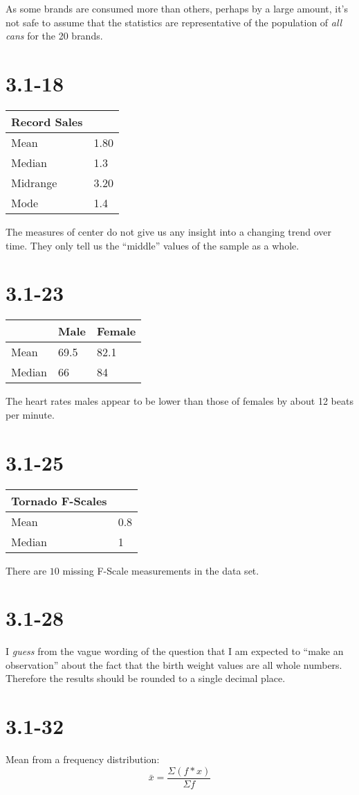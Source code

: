 \documentclass[12pt,fleqn]{article}
\newcommand{\chapter}{3.1}
\newcommand{\problem}[1]{\vspace{5ex}\section*{\chapter-#1}}
\newcommand{\thead}[1]{\textnormal{\textbf{#1}}}
\begin{document}
As some brands are consumed more than others, perhaps by a large amount, it's not safe to assume that the statistics are representative of the population of \textit{all cans} for the 20 brands.


\problem{18}
\begin{tabular}{@{}ll@{}}
  \thead{Record Sales} \\
  \toprule
  Mean & 1.80 \\
  Median & 1.3 \\
  Midrange & 3.20 \\
  Mode & 1.4 \\
  \bottomrule
\end{tabular}
\vspace{1em}

The measures of center do not give us any insight into a changing trend over time. They only tell us the ``middle'' values of the sample as a whole.


\problem{23}
\begin{tabular}{@{}lll@{}}
  & \thead{Male} & \thead{Female} \\
  \toprule
  Mean & 69.5 & 82.1 \\
  Median & 66 & 84 \\
  \bottomrule
\end{tabular}
\vspace{1em}

The heart rates males appear to be lower than those of females by about 12 beats per minute.


\problem{25}
\begin{tabular}{@{}ll@{}}
  \thead{Tornado F-Scales} \\
  \toprule
  Mean & 0.8 \\
  Median & 1 \\
  \bottomrule
\end{tabular}
\vspace{1em}

There are $10$ missing F-Scale measurements in the data set.


\problem{28}
I \textit{guess} from the vague wording of the question that I am expected to ``make an observation'' about the fact that the birth weight values are all whole numbers. Therefore the results should be rounded to a single decimal place.


\pagebreak
\problem{32}

Mean from a frequency distribution:
\[
  \bar{x} = \frac{\Sigma (f * x)}{\Sigma f}
\]
\end{document}
